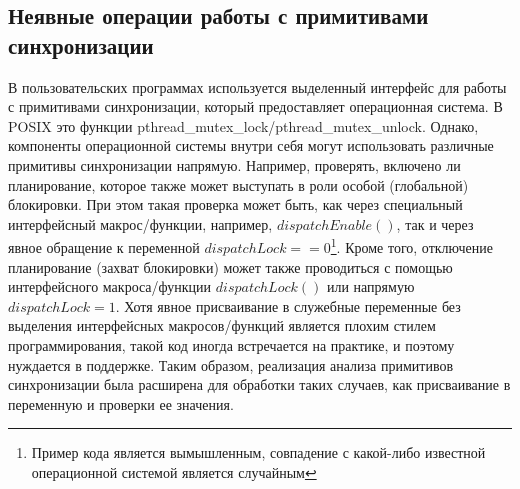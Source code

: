 \subsection{Неявные операции работы с примитивами синхронизации}
В пользовательских программах используется выделенный интерфейс для работы с примитивами синхронизации, который предоставляет операционная система.
В POSIX это функции pthread\_mutex\_lock/pthread\_mutex\_unlock. 
Однако, компоненты операционной системы внутри себя могут использовать различные примитивы синхронизации напрямую.
Например, проверять, включено ли планирование, которое также может выступать в роли особой (глобальной) блокировки.
При этом такая проверка может быть, как через специальный интерфейсный макрос/функции, например, $dispatchEnable()$, так и через явное обращение к переменной $dispatchLock == 0$\footnote{Пример кода является вымышленным, совпадение с какой-либо известной операционной системой является случайным}.
Кроме того, отключение планирование (захват блокировки) может также проводиться с помощью интерфейсного макроса/функции $dispatchLock()$ или напрямую $dispatchLock = 1$.
Хотя явное присваивание в служебные переменные без выделения интерфейсных макросов/функций является плохим стилем программирования, такой код иногда встречается на практике, и поэтому нуждается в поддержке.
Таким образом, реализация анализа примитивов синхронизации была расширена для обработки таких случаев, как присваивание в переменную и проверки ее значения.


